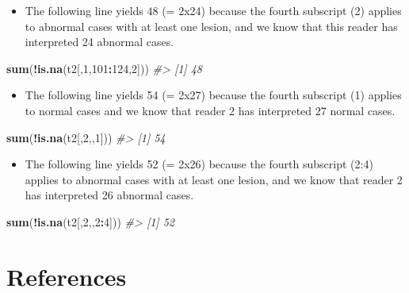 \documentclass[]{book}
\newenvironment{Shaded}{\begin{snugshade}}{\end{snugshade}}
\newcommand{\CommentTok}[1]{\textcolor[rgb]{0.56,0.35,0.01}{\textit{#1}}}
\newcommand{\DecValTok}[1]{\textcolor[rgb]{0.00,0.00,0.81}{#1}}
\newcommand{\KeywordTok}[1]{\textcolor[rgb]{0.13,0.29,0.53}{\textbf{#1}}}
\newcommand{\NormalTok}[1]{#1}
\newcommand{\OperatorTok}[1]{\textcolor[rgb]{0.81,0.36,0.00}{\textbf{#1}}}
\providecommand{\tightlist}{%
  \setlength{\itemsep}{0pt}\setlength{\parskip}{0pt}}
\begin{document}
\begin{itemize}
\tightlist
\item
  The following line yields 48 (= 2x24) because the fourth subscript (2) applies to abnormal cases with at least one lesion, and we know that this reader has interpreted 24 abnormal cases.
\end{itemize}

\begin{Shaded}
\begin{Highlighting}[]
\KeywordTok{sum}\NormalTok{(}\OperatorTok{!}\KeywordTok{is.na}\NormalTok{(t2[,}\DecValTok{1}\NormalTok{,}\DecValTok{101}\OperatorTok{:}\DecValTok{124}\NormalTok{,}\DecValTok{2}\NormalTok{]))}
\CommentTok{#> [1] 48}
\end{Highlighting}
\end{Shaded}

\begin{itemize}
\tightlist
\item
  The following line yields 54 (= 2x27) because the fourth subscript (1) applies to normal cases and we know that reader 2 has interpreted 27 normal cases.
\end{itemize}

\begin{Shaded}
\begin{Highlighting}[]
\KeywordTok{sum}\NormalTok{(}\OperatorTok{!}\KeywordTok{is.na}\NormalTok{(t2[,}\DecValTok{2}\NormalTok{,,}\DecValTok{1}\NormalTok{]))}
\CommentTok{#> [1] 54}
\end{Highlighting}
\end{Shaded}

\begin{itemize}
\tightlist
\item
  The following line yields 52 (= 2x26) because the fourth subscript (2:4) applies to abnormal cases with at least one lesion, and we know that reader 2 has interpreted 26 abnormal cases.
\end{itemize}

\begin{Shaded}
\begin{Highlighting}[]
\KeywordTok{sum}\NormalTok{(}\OperatorTok{!}\KeywordTok{is.na}\NormalTok{(t2[,}\DecValTok{2}\NormalTok{,,}\DecValTok{2}\OperatorTok{:}\DecValTok{4}\NormalTok{]))}
\CommentTok{#> [1] 52}
\end{Highlighting}
\end{Shaded}

\hypertarget{references-9}{%
\section{References}\label{references-9}}


\end{document}
